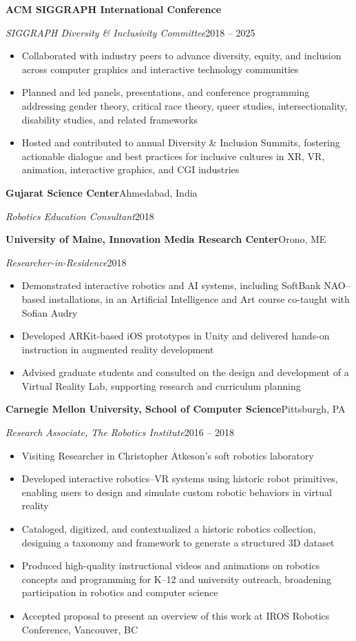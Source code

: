 \documentclass[10pt,letterpaper]{article}
\newcommand{\entry}[4]{%
  \par\addvspace{2.5pt}%
  {\large\bfseries #1}\hfill #2\par\nobreak
  \textit{#3}\hfill #4\par\nobreak}
\newenvironment{bullets}{%
  \begin{itemize}[leftmargin=0.95em,labelsep=0.35em,itemsep=0pt,parsep=0pt,topsep=1pt,partopsep=0pt,
    label={\raisebox{0.25ex}{\tiny$\bullet$}}]}{\end{itemize}}
\begin{document}
\entry{ACM SIGGRAPH International Conference}{}{SIGGRAPH Diversity \& Inclusivity Committee}{2018 -- 2025}
\begin{bullets}
\item Collaborated with industry peers to advance diversity, equity, and inclusion across computer graphics and interactive technology communities
\item Planned and led panels, presentations, and conference programming addressing gender theory, critical race theory, queer studies, intersectionality, disability studies, and related frameworks
\item Hosted and contributed to annual Diversity \& Inclusion Summits, fostering actionable dialogue and best practices for inclusive cultures in XR, VR, animation, interactive graphics, and CGI industries
\end{bullets}

\entry{Gujarat Science Center}{Ahmedabad, India}{Robotics Education Consultant}{2018}

\entry{University of Maine, Innovation Media Research Center}{Orono, ME}{Researcher-in-Residence}{2018}
\begin{bullets}
\item Demonstrated interactive robotics and AI systems, including SoftBank NAO--based installations, in an Artificial Intelligence and Art course co-taught with Sofian Audry
\item Developed ARKit-based iOS prototypes in Unity and delivered hands-on instruction in augmented reality development
\item Advised graduate students and consulted on the design and development of a Virtual Reality Lab, supporting research and curriculum planning
\end{bullets}

\entry{Carnegie Mellon University, School of Computer Science}{Pittsburgh, PA}{Research Associate, The Robotics Institute}{2016 -- 2018}
\begin{bullets}
\item Visiting Researcher in Christopher Atkeson's soft robotics laboratory
\item Developed interactive robotics--VR systems using historic robot primitives, enabling users to design and simulate custom robotic behaviors in virtual reality
\item Cataloged, digitized, and contextualized a historic robotics collection, designing a taxonomy and framework to generate a structured 3D dataset
\item Produced high-quality instructional videos and animations on robotics concepts and programming for K--12 and university outreach, broadening participation in robotics and computer science
\item Accepted proposal to present an overview of this work at IROS Robotics Conference, Vancouver, BC
\end{bullets}
\end{document}
